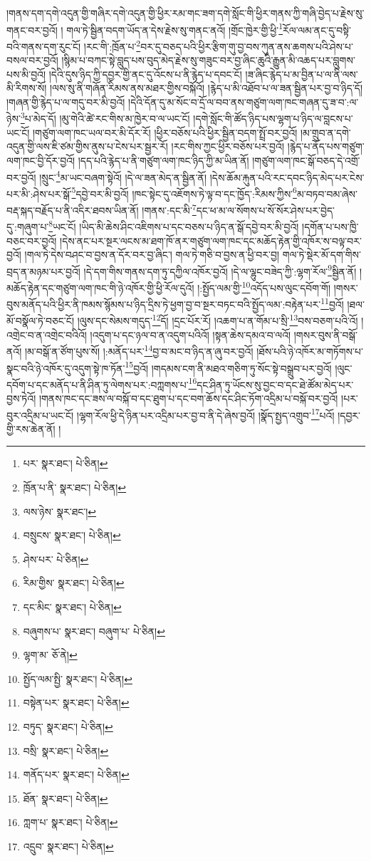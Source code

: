 །གནས་དག་དགེ་འདུན་གྱི་གཞིར་དགེ་འདུན་གྱི་ཕྱིར་རམ་གང་ཟག་དགེ་སློང་གི་ཕྱིར་གནས་ཀྱི་གཞི་བྱེད་པ་རྗེས་སུ་གནང་བར་བྱའོ། །
གལ་ཏེ་སྦྱིན་བདག་ཡོད་ན་དེས་རྗེས་སུ་གནང་ནའོ། །གྲོང་ཁྱེར་གྱི་ཕྱི་\footnote{པར་  སྣར་ཐང་།  པེ་ཅིན། }རོལ་ལམ་ནང་དུ་བསྟི་བའི་གནས་དག་རུང་ངོ། །རང་གི་:ཁྲོན་པ་\footnote{ཁྲོན་པ་ནི་  སྣར་ཐང་།  པེ་ཅིན། }བར་དུ་བཅད་པའི་ཕྱིར་རྩིག་གུ་བྱ་བས་ཀུན་ནས་ཆགས་པའི་ཤེས་པ་བསལ་བར་བྱའོ། །སྙིམ་པ་བཀང་སྟེ་བླུད་པས་བུད་མེད་རྗེས་སུ་གཟུང་བར་བྱ་ཞིང་ཆུའི་རྒྱུན་མི་འཆད་པར་བླུགས་པས་མི་བྱའོ། །དེའི་དུས་ཉིད་ཀྱི་དབྱར་གྱི་ནང་དུ་འོངས་པ་ནི་རྙེད་པ་དབང་ངོ། །ཟ་ཞིང་རྙེད་པ་མ་བྱིན་པ་ལ་ནི་ལས་མི་རིགས་སོ། །ལས་སུ་ནི་གཞོན་རིམས་ནས་མཐར་གྱིས་བསྐོའོ། །རྙེད་པ་མི་འཐོབ་པ་ལ་ཟན་སྦྱིན་པར་བྱ་བ་ཉིད་དོ། །གཞན་གྱི་རྙེད་པ་ལ་གདུ་བར་མི་བྱའོ། །དེའི་དོན་དུ་མ་སོང་བ་དྲོ་ལ་བབ་ནས་གཙུག་ལག་ཁང་གཞན་དུ་ཟ་བ་:ལ་ཉེས་\footnote{ལས་ཉེས་  སྣར་ཐང་། }པ་མེད་དོ། །མུ་གེའི་ཚེ་རང་གིས་མ་ཁྱེར་བ་ལ་ཡང་ངོ། །དགེ་སློང་གི་ཚོད་ཉིད་པས་ལྷག་པ་ཉིད་ལ་བླངས་པ་ཡང་ངོ། །གཙུག་ལག་ཁང་ཡལ་བར་མི་དོར་རོ། །ཕྱིར་བཅོས་པའི་ཕྱིར་སྦྱིན་བདག་སྤྲོ་བར་བྱའོ། །མ་གྲུབ་ན་དགེ་འདུན་གྱི་ལས་ཇི་ཙམ་གྱིས་ནུས་པ་ངེས་པར་སྦྱར་རོ། །རང་གིས་ཀྱང་ཕྱིར་བཅོས་པར་བྱའོ། །རྙེད་པ་ནོད་པས་གཙུག་ལག་ཁང་བྱི་དོར་བྱའོ། །དད་པའི་རྙེད་པ་ནི་གཙུག་ལག་ཁང་ཉིད་ཀྱི་མ་ཡིན་ནོ། །གཙུག་ལག་ཁང་སྒོ་བཅད་དེ་འགྲོ་བར་བྱའོ། །སྲུང་\footnote{བསྲུངས་  སྣར་ཐང་།  པེ་ཅིན། }མ་ཡང་བཞག་སྟེའོ། །དེ་ལ་ཟན་མེད་ན་སྦྱིན་ནོ། །དེས་ཆོམ་རྐུན་པའི་རང་དབང་ཉིད་མེད་པར་ངེས་པར་མི་:ཤེས་པར་སྒོ་\footnote{ཤེས་པར་  པེ་ཅིན། }དབྱེ་བར་མི་བྱའོ། །ཁང་སྟེང་དུ་འཇོགས་ཏེ་ལྟ་བ་དང་ཁྱོད་:རིམས་ཀྱིས་\footnote{རིམ་གྱིས་  སྣར་ཐང་།  པེ་ཅིན། }མ་བཏབ་བམ་ཞེས་བརྡ་སྐད་བརྗོད་པ་ནི་འདིར་ཐབས་ཡིན་ནོ། །གནས་:དང་མི་\footnote{དང་མིང་  སྣར་ཐང་།  པེ་ཅིན། }དང་ཕ་མ་ལ་སོགས་པ་སོ་སོར་ཤེས་པར་བྱེད་དུ་:གཞུག་པ་\footnote{བཞུགས་པ་  སྣར་ཐང་། བཞུག་པ་  པེ་ཅིན། }ཡང་ངོ། །ཡིད་མི་ཆེས་ཤིང་འཇིགས་པ་དང་བཅས་པ་ཉིད་ན་སྒོ་དབྱེ་བར་མི་བྱའོ། །དགོན་པ་པས་ཁྱི་བཅང་བར་བྱའོ། །དེས་ནང་པར་སྔར་ལངས་མ་ཐག་ཁོ་ནར་གཙུག་ལག་ཁང་དང་མཆོད་རྟེན་གྱི་འཁོར་ས་བལྟ་བར་བྱའོ། །གལ་ཏེ་དེས་བཤང་བ་བྱས་ན་དོར་བར་བྱ་ཞིང་། གལ་ཏེ་གཅི་བ་བྱས་ན་ཕྱི་བར་བྱ། གལ་ཏེ་སྡེར་མོ་དག་གིས་བྲད་ན་མཉམ་པར་བྱའོ། །དེ་དག་གིས་གནས་དག་ཏུ་དཀྱིལ་འཁོར་བྱའོ། །དེ་ལ་ལྷུང་བཟེད་ཀྱི་:ལྷག་རོལ་\footnote{ལྷག་མ་  ཅོ་ནེ། }སྦྱིན་ནོ། །མཆོད་རྟེན་དང་གཙུག་ལག་ཁང་གི་ཉེ་འཁོར་གྱི་ཕྱི་རོལ་དུའོ། །:སྤྱོད་ལམ་གྱི་\footnote{སྤྱོད་ལམ་སྤྱི་  སྣར་ཐང་།  པེ་ཅིན། }འདོད་པས་ལུང་དབོག་གོ། །གསར་བུས་མནོད་པའི་ཕྱིར་ནི་ཁམས་སྙོམས་པ་ཉིད་དྲིས་ཏེ་ཕྱག་བྱ་བ་སྔར་བཏང་བའི་སྤྱོད་ལམ་:བརྟེན་པར་\footnote{བསྟེན་པར་  སྣར་ཐང་།  པེ་ཅིན། }བྱའོ། །ཐལ་མོ་བསྣོལ་ཏེ་བཅང་ངོ། །ལུས་དང་སེམས་གདུད་\footnote{བཏུད་  སྣར་ཐང་།  པེ་ཅིན། }དོ། །དྲང་པོར་རོ། །འཆག་པ་ན་གོམ་པ་སྲི་\footnote{བསྲི་  སྣར་ཐང་།  པེ་ཅིན། }བས་བཅག་པའི་འོ། །འགྲེང་བ་ན་འགྲེང་བའིའོ། །འདུག་པ་དང་ཉལ་བ་ན་འདུག་པའིའོ། །སྟན་ཆེས་དམའ་བ་ལའོ། །གསར་བུས་ནི་བསྒོ་ནའོ། །མ་བསྒོ་ན་ཙོག་པུས་སོ། །:མནོད་པར་\footnote{གནོད་པར་  སྣར་ཐང་།  པེ་ཅིན། }བྱ་བ་མང་བ་ཉིད་ན་ཞུ་བར་བྱའོ། །ཐོས་པའི་ཉེ་འཁོར་མ་གཏོགས་པ་སྣང་བའི་ཉེ་འཁོར་དུ་འདུག་སྟེ་ཁ་ཏོན་\footnote{ཐོན་  སྣར་ཐང་།  པེ་ཅིན། }བྱའོ། །གདམས་ངག་ནི་མཐའ་གཅིག་ཏུ་སོང་སྟེ་བསྒྲུབ་པར་བྱའོ། །ལུང་དབོག་པ་དང་མནོད་པ་ནི་ཤིན་ཏུ་ལེགས་པར་:བཀླགས་པ་\footnote{ཀླག་པ་  སྣར་ཐང་།  པེ་ཅིན། }དང་ཤིན་ཏུ་ཡོངས་སུ་བྱང་བ་དང་ཐེ་ཚོམ་མེད་པར་བྱས་ཏེའོ། །གནས་ཁང་དང་ཟས་ལ་བསྐོ་བ་དང་ཐུག་པ་དང་བག་ཆོས་དང་ཤིང་ཏོག་འདྲིམ་པ་བསྐོ་བར་བྱའོ། །པར་བུར་འདྲིམ་པ་ཡང་ངོ། །ལྷག་རོལ་ཕྱི་དེ་ཉིན་པར་འདྲིམ་པར་བྱ་བ་ནི་དེ་ཞེས་བྱའོ། །སྣོད་སྤྱད་འགྲུབ་\footnote{འདྲུབ་  སྣར་ཐང་།  པེ་ཅིན། }པའོ། །དབྱར་གྱི་རས་ཆེན་ནོ། །
